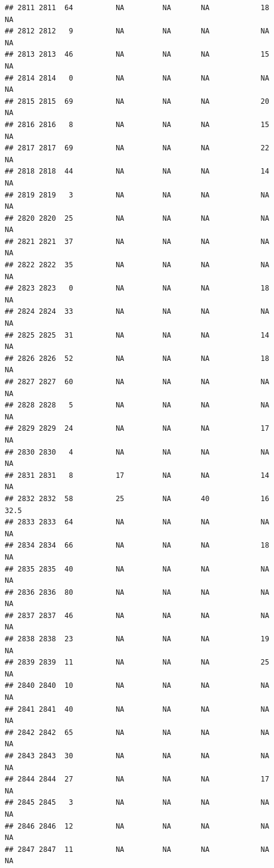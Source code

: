 \documentclass[man]{apa6}
\begin{document}
\begin{verbatim}
## 2811 2811  64          NA         NA       NA            18       NA
## 2812 2812   9          NA         NA       NA            NA       NA
## 2813 2813  46          NA         NA       NA            15       NA
## 2814 2814   0          NA         NA       NA            NA       NA
## 2815 2815  69          NA         NA       NA            20       NA
## 2816 2816   8          NA         NA       NA            15       NA
## 2817 2817  69          NA         NA       NA            22       NA
## 2818 2818  44          NA         NA       NA            14       NA
## 2819 2819   3          NA         NA       NA            NA       NA
## 2820 2820  25          NA         NA       NA            NA       NA
## 2821 2821  37          NA         NA       NA            NA       NA
## 2822 2822  35          NA         NA       NA            NA       NA
## 2823 2823   0          NA         NA       NA            18       NA
## 2824 2824  33          NA         NA       NA            NA       NA
## 2825 2825  31          NA         NA       NA            14       NA
## 2826 2826  52          NA         NA       NA            18       NA
## 2827 2827  60          NA         NA       NA            NA       NA
## 2828 2828   5          NA         NA       NA            NA       NA
## 2829 2829  24          NA         NA       NA            17       NA
## 2830 2830   4          NA         NA       NA            NA       NA
## 2831 2831   8          17         NA       NA            14       NA
## 2832 2832  58          25         NA       40            16     32.5
## 2833 2833  64          NA         NA       NA            NA       NA
## 2834 2834  66          NA         NA       NA            18       NA
## 2835 2835  40          NA         NA       NA            NA       NA
## 2836 2836  80          NA         NA       NA            NA       NA
## 2837 2837  46          NA         NA       NA            NA       NA
## 2838 2838  23          NA         NA       NA            19       NA
## 2839 2839  11          NA         NA       NA            25       NA
## 2840 2840  10          NA         NA       NA            NA       NA
## 2841 2841  40          NA         NA       NA            NA       NA
## 2842 2842  65          NA         NA       NA            NA       NA
## 2843 2843  30          NA         NA       NA            NA       NA
## 2844 2844  27          NA         NA       NA            17       NA
## 2845 2845   3          NA         NA       NA            NA       NA
## 2846 2846  12          NA         NA       NA            NA       NA
## 2847 2847  11          NA         NA       NA            NA       NA

\end{verbatim}
\end{document}
